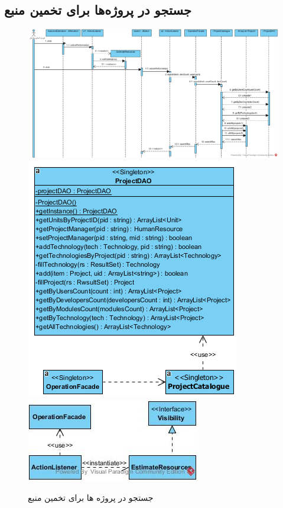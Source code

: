 \begin{landscape}
\newpage
\section{جستجو در پروژه‌ها برای تخمین منبع}
\begin{figure}[H]
	\centering
	\includegraphics[scale=0.6]{img/sequence-design/SearchInProjects}
	\includegraphics[scale=0.5]{img/sequence-design/SearchInProjectsC}
	\includegraphics[scale=0.7]{img/sequence-design/SearchInProjectsUI}
	\caption{جستجو در پروژه ها برای تخمین منبع}
\end{figure}


\end{landscape}
